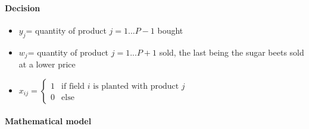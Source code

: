 \documentclass{article}
\begin{document}
\paragraph{Decision}
\begin{itemize}
	\item $y_j$= quantity of product $j=1...P-1$ bought
	\item $w_j$= quantity of product $j=1...P+1$  sold, the last being the sugar beets sold at a lower price
	\item $x_{ij}= \left\{
	\begin{array}{ll}
	1 & \text{if field $i$ is planted with product $j$ }\\
	0 & \text{else}
	\end{array}
	 \right.$
\end{itemize}

\paragraph{Mathematical model}
\end{document}
